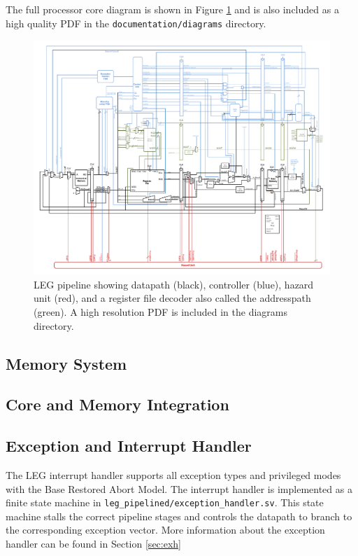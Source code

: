 The full processor core diagram is shown in Figure \ref{fig:pipelinedfull} and is also included as a high quality PDF in the \texttt{documentation/diagrams} directory.

\begin{figure}[h!]
\centering
\includegraphics[width=\textwidth]{./diagrams/pipelinedfull.pdf}
\caption{LEG pipeline showing datapath (black), controller (blue), hazard unit (red), and a register file decoder also called the addresspath (green). A high resolution PDF is included in the diagrams directory.}
\label{fig:pipelinedfull}
\end{figure}

\subsection{Memory System}

\subsection{Core and Memory Integration}

\subsection{Exception and Interrupt Handler}

The LEG interrupt handler supports all exception types and privileged modes with the Base Restored Abort Model.
The interrupt handler is implemented as a finite state machine in \texttt{leg\_pipelined/exception\_handler.sv}.
This state machine stalls the correct pipeline stages and controls the datapath to branch to the corresponding exception vector.
More information about the exception handler can be found in Section \ref{sec:exh}
